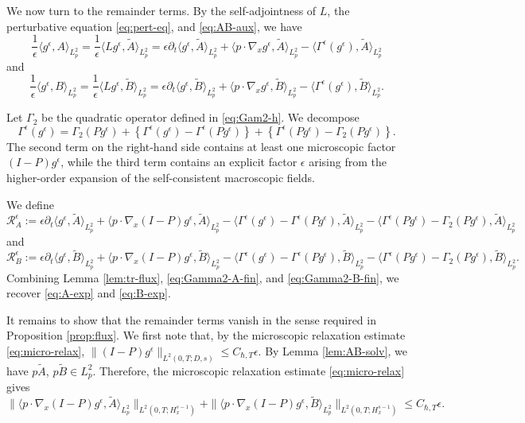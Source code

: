 \documentclass[10pt,reqno]{amsart}
\numberwithin{equation}{section}
\newcommand{\lt}{\left}
\newcommand{\rt}{\right}
\newcommand{\lal}{\langle}
\newcommand{\ral}{\rangle}
\newcommand{\bq}{\begin{equation}}
\newcommand{\eq}{\end{equation}}
\newcommand{\pa}{\partial}
\newcommand{\calR}{\mathcal R}
\begin{document}
We now turn to the remainder terms.  By the self-adjointness of $L $, the perturbative equation \eqref{eq:pert-eq}, and \eqref{eq:AB-aux}, we have
\[
\frac{1}{\epsilon}\lal g^\epsilon,A \ral_{L^2_p} =\frac{1}{\epsilon}\lal L  g^\epsilon,\widetilde A \ral_{L^2_p} =\epsilon\pa_t\lal g^\epsilon,\widetilde A \ral_{L^2_p}+\lal p\cdot\nabla_xg^\epsilon,\widetilde A \ral_{L^2_p}-\lal\Gamma^\epsilon(g^\epsilon),\widetilde A \ral_{L^2_p}
\]
and
\[
\frac{1}{\epsilon}\lal g^\epsilon,B \ral_{L^2_p} =\frac{1}{\epsilon}\lal L  g^\epsilon,\widetilde B \ral_{L^2_p} =\epsilon\pa_t\lal g^\epsilon,\widetilde B \ral_{L^2_p}+\lal p\cdot\nabla_xg^\epsilon,\widetilde B \ral_{L^2_p}-\lal\Gamma^\epsilon(g^\epsilon),\widetilde B \ral_{L^2_p}.
\]

Let $\Gamma_2$ be the quadratic operator defined in \eqref{eq:Gam2-h}. We decompose
\[
\Gamma^\epsilon(g^\epsilon) = \Gamma_2 (P g^\epsilon)+\lt\{\Gamma^\epsilon(g^\epsilon)-\Gamma^\epsilon(P g^\epsilon)\rt\} +\lt\{\Gamma^\epsilon(P g^\epsilon)-\Gamma_2 (P g^\epsilon)\rt\}.
\]
The second term on the right-hand side contains at least one microscopic factor $(I-P)g^\epsilon$, while the third term contains an explicit factor $\epsilon$ arising from the higher-order expansion of the self-consistent macroscopic fields.

We define
\[
\calR_A^\epsilon :=\epsilon\pa_t\lal g^\epsilon,\widetilde A \ral_{L^2_p}+\lal p\cdot\nabla_x(I-P)g^\epsilon,\widetilde A \ral_{L^2_p} -\lal\Gamma^\epsilon(g^\epsilon)-\Gamma^\epsilon(P g^\epsilon),\widetilde A \ral_{L^2_p} -\lal\Gamma^\epsilon(P g^\epsilon)-\Gamma_2 (P g^\epsilon),\widetilde A \ral_{L^2_p}
\]
and
\[
\calR_B^\epsilon :=\epsilon\pa_t\lal g^\epsilon,\widetilde B \ral_{L^2_p}+\lal p\cdot\nabla_x(I-P)g^\epsilon,\widetilde B \ral_{L^2_p} -\lal\Gamma^\epsilon(g^\epsilon)-\Gamma^\epsilon(P g^\epsilon),\widetilde B \ral_{L^2_p} -\lal\Gamma^\epsilon(P g^\epsilon)-\Gamma_2 (P g^\epsilon),\widetilde B \ral_{L^2_p}.
\]
Combining Lemma \ref{lem:tr-flux}, \eqref{eq:Gamma2-A-fin}, and \eqref{eq:Gamma2-B-fin}, we recover \eqref{eq:A-exp} and \eqref{eq:B-exp}.

 

It remains to show that the remainder terms vanish in the sense required in Proposition \ref{prop:flux}. We first note that, by the microscopic relaxation estimate \eqref{eq:micro-relax}, $\|(I-P)g^\epsilon\|_{L^2(0,T;D,s)}\le C_{\hbar,T}\epsilon$. By Lemma \ref{lem:AB-solv}, we have $p\widetilde A$, $p\widetilde B  \in L^2_p$. Therefore, the microscopic relaxation estimate \eqref{eq:micro-relax} gives 
\bq\label{eq:tr-rem}
\| \lal p\cdot\nabla_x (I-P)g^\epsilon, \widetilde A  \ral_{L^2_p} \|_{L^2(0,T;H^{s-1}_x)} + \| \lal p\cdot\nabla_x (I-P)g^\epsilon, \widetilde B  \ral_{L^2_p} \|_{L^2(0,T;H^{s-1}_x)} \le C_{\hbar,T} \epsilon.
\eq
\end{document}
